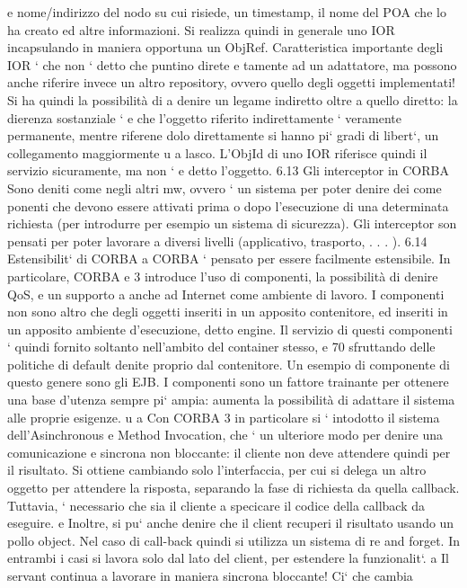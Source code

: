 \documentclass[a4paper,12pt]{article}
\begin{document}
e
nome/indirizzo del nodo su cui risiede, un timestamp, il nome del POA che lo ha
creato ed altre informazioni. Si realizza quindi in generale uno IOR incapsulando
in maniera opportuna un ObjRef.
Caratteristica importante degli IOR ` che non ` detto che puntino direte
e
tamente ad un adattatore, ma possono anche riferire invece un altro repository, ovvero quello degli oggetti
implementati! Si ha quindi la possibilità di
a
denire un legame indiretto oltre a quello diretto: la dierenza sostanziale `
e
che l'oggetto riferito indirettamente ` veramente permanente, mentre riferene
dolo direttamente si hanno pi` gradi di libert`, un collegamento maggiormente
u
a
lasco. L'ObjId di uno IOR riferisce quindi il servizio sicuramente, ma non `
e
detto l'oggetto.
6.13
Gli interceptor in CORBA
Sono deniti come negli altri mw, ovvero ` un sistema per poter denire dei come
ponenti che devono essere attivati prima o dopo l'esecuzione di una determinata
richiesta (per introdurre per esempio un sistema di sicurezza). Gli interceptor
son pensati per poter lavorare a diversi livelli (applicativo, trasporto, . . . ).
6.14
Estensibilit` di CORBA
a
CORBA ` pensato per essere facilmente estensibile. In particolare, CORBA
e
3 introduce l'uso di componenti, la possibilità di denire QoS, e un supporto
a
anche ad Internet come ambiente di lavoro.
I componenti non sono altro che degli oggetti inseriti in un apposito contenitore, ed inseriti in un apposito ambiente
d'esecuzione, detto engine. Il servizio
di questi componenti ` quindi fornito soltanto nell'ambito del container stesso,
e
70
sfruttando delle politiche di default denite proprio dal contenitore. Un esempio
di componente di questo genere sono gli EJB.
I componenti sono un fattore trainante per ottenere una base d'utenza sempre pi` ampia: aumenta la possibilità di
adattare il sistema alle proprie esigenze.
u
a
Con CORBA 3 in particolare si ` intodotto il sistema dell'Asinchronous
e
Method Invocation, che ` un ulteriore modo per denire una comunicazione
e
sincrona non bloccante: il cliente non deve attendere quindi per il risultato.
Si ottiene cambiando solo l'interfaccia, per cui si delega un altro oggetto per
attendere la risposta, separando la fase di richiesta da quella callback. Tuttavia,
` necessario che sia il cliente a specicare il codice della callback da eseguire.
e
Inoltre, si pu` anche denire che il client recuperi il risultato usando un pollo
object. Nel caso di call-back quindi si utilizza un sistema di re and forget. In
entrambi i casi si lavora solo dal lato del client, per estendere la funzionalit`.
a
Il servant continua a lavorare in maniera sincrona bloccante! Ci` che cambia
\end{document}
